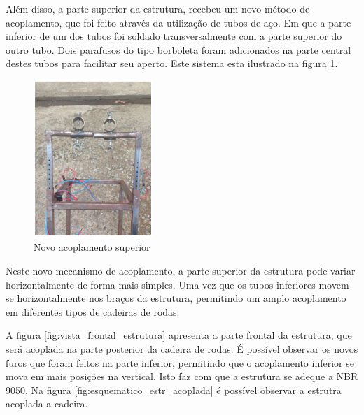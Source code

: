 Além disso, a parte superior da estrutura, recebeu um novo método de acoplamento, que foi feito através da utilização de tubos de aço. Em que a parte inferior de um dos tubos foi soldado transversalmente com a parte superior do outro tubo. Dois parafusos do tipo borboleta foram adicionados na parte central destes tubos para facilitar seu aperto. Este sistema esta ilustrado na figura \ref{fig:novo_acoplamento_superior}.

\begin{figure}[!ht]
\centering
\includegraphics[width=0.4\textwidth]{figuras/resultados/novo_acoplamento_superior}
\caption{Novo acoplamento superior}
\label{fig:novo_acoplamento_superior}
\end{figure}


Neste novo mecanismo de acoplamento, a parte superior da estrutura pode variar horizontalmente de forma mais simples. Uma vez que os tubos inferiores movem-se horizontalmente nos braços da estrutura, permitindo um amplo acoplamento em diferentes tipos de cadeiras de rodas.

A figura \ref{fig:vista_frontal_estrutura} apresenta a parte frontal da estrutura, que será acoplada na parte posterior da cadeira de rodas. É possível observar os novos furos que foram feitos na parte inferior, permitindo que o acoplamento inferior se mova em mais posições na vertical. Isto faz com que a estrutura se adeque a NBR 9050. Na figura \ref{fig:esquematico_estr_acoplada} é possível observar a estrutra acoplada a cadeira.

